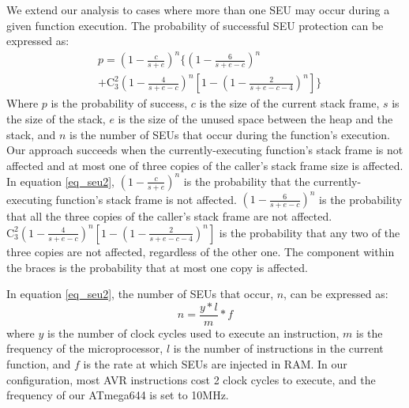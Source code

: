 We extend our analysis to cases where more than one SEU may occur during a given function execution. The probability of successful SEU protection can be expressed as:
\begin{equation}\label{eq_seu2}
\begin{split}
&p=(1-\frac{c}{s+e})^n\{(1-\frac{6}{s+e-c})^n \\
&+\mathrm{C}_3^2(1-\frac{4}{s+e-c})^n[1-(1-\frac{2}{s+e-c-4})^n]\}
\end{split}
\end{equation}
Where $p$ is the probability of success, $c$ is the size of the current stack frame, $s$ is the size of the stack, $e$ is the size of the unused space between the heap and the stack, and $n$ is the number of SEUs that occur during the function's execution. Our approach succeeds when the currently-executing function's stack frame is not affected and at most one of three copies of the caller's stack frame size is affected. In equation \ref{eq_seu2}, $(1-\frac{c}{s+e})^n$ is the probability that the currently-executing function's stack frame is not affected. $(1-\frac{6}{s+e-c})^n$ is the probability that all the three copies of the caller's stack frame are not affected. $\mathrm{C}_3^2(1-\frac{4}{s+e-c})^n[1-(1-\frac{2}{s+e-c-4})^n]$ is the probability that any two of the three copies are not affected, regardless of the other one. The component within the braces is the probability that at most one copy is affected.%

In equation \ref{eq_seu2}, the number of SEUs that occur, $n$, can be expressed as:
\begin{equation}
n = \frac{y*l}{m}*f
\end{equation}
where $y$ is the number of clock cycles used to execute an instruction, $m$ is the frequency of the microprocessor, $l$ is the number of instructions in the current function, and $f$ is the rate at which SEUs are injected in RAM. In our configuration, most AVR instructions cost 2 clock cycles to execute, and the frequency of our ATmega644 is set to 10MHz.

